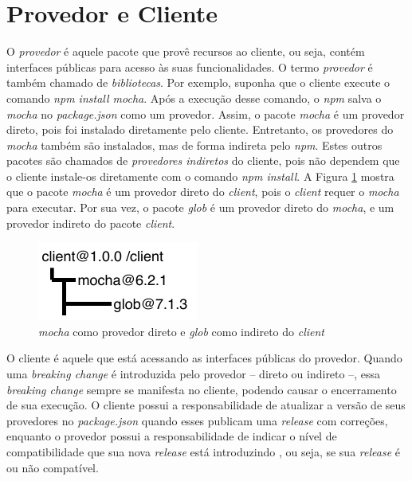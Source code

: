 \section{Provedor e Cliente}
\label{ref-teo:prov_clie}
O \textit{provedor} é aquele pacote que provê recursos ao cliente, ou seja, contém interfaces públicas para acesso às suas funcionalidades. O termo \textit{provedor} é também chamado de \textit{bibliotecas}. Por exemplo, suponha que o cliente execute o comando \textit{npm install mocha}. Após a execução desse comando, o \textit{npm} salva o \textit{mocha} no \textit{package.json} como um provedor. Assim, o pacote \textit{mocha} é um provedor direto, pois foi instalado diretamente pelo cliente. Entretanto, os provedores do \textit{mocha} também são instalados, mas de forma indireta pelo \textit{npm}. Estes outros pacotes são chamados de \textit{provedores indiretos} do cliente, pois não dependem que o cliente instale-os diretamente com o comando \textit{npm install}. A Figura \ref{fig:provider} mostra que o pacote \textit{mocha} é um provedor direto do \textit{client}, pois o \textit{client} requer o \textit{mocha} para executar. Por sua vez, o pacote \textit{glob} é um provedor direto do \textit{mocha}, e um provedor indireto do pacote \textit{client}.

\begin{figure}
    \centering
    \includegraphics[scale=1.4]{figuras/provider_directly_undirectly.pdf}
    \caption{\textit{mocha} como provedor direto e \textit{glob} como indireto do \textit{client}}
    \label{fig:provider}
\end{figure}{}

O cliente é aquele que está acessando as interfaces públicas do provedor. Quando uma \textit{breaking change} é introduzida pelo provedor -- direto ou indireto --, essa \textit{breaking change} sempre se manifesta no cliente, podendo causar o encerramento de sua execução. O cliente possui a responsabilidade de atualizar a versão de seus provedores no \textit{package.json} quando esses publicam uma \textit{release} com correções, enquanto o provedor possui a responsabilidade de indicar o nível de compatibilidade que sua nova \textit{release} está introduzindo \cite{teorical_reference:semver}, ou seja, se sua \textit{release} é ou não compatível.

